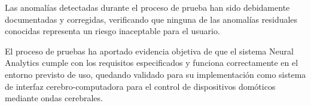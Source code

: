 Las anomalías detectadas durante el proceso de prueba han sido debidamente documentadas y corregidas, verificando que ninguna de las anomalías residuales conocidas representa un riesgo inaceptable para el usuario.

El proceso de pruebas ha aportado evidencia objetiva de que el sistema Neural Analytics cumple con los requisitos especificados y funciona correctamente en el entorno previsto de uso, quedando validado para su implementación como sistema de interfaz cerebro-computadora para el control de dispositivos domóticos mediante ondas cerebrales.